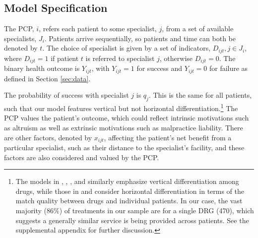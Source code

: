 \documentclass[12pt]{article}
\begin{document}
\subsection{Model Specification}
\label{sec:specification}

The PCP, $i$, refers each patient to some specialist, $j$, from a set of available specialists, $J_i$.  Patients arrive sequentially, so patients and time can both be denoted by $t$. The choice of specialist is given by a set of indicators, $D_{ijt}, j \in J_i$, where $D_{ijt} = 1$ if patient $t$ is referred to specialist $j$, otherwise $D_{ijt} = 0$. The binary health outcome is $Y_{ijt}$, with $Y_{ijt}=1$ for success and  $Y_{ijt}=0$ for failure as defined in Section \ref{sec:data}.

The probability of success with specialist $j$ is $q_j$. This is the same for all patients, such that our model features vertical but not horizontal differentiation.\footnote{The models in \cite{coscelli2004}, \cite{ching2010}, \cite{ferreyra2011}, and \cite{chan2013} similarly emphasize vertical differentiation among drugs, while those in \cite{crawford2005} and \cite{dickstein2018} consider horizontal differentiation in terms of the match quality between drugs and individual patients. In our case, the vast majority (86\%) of treatments in our sample are for a single DRG (470), which suggests a generally similar service is being provided across patients. See the supplemental appendix for further discussion.} The PCP values the patient's outcome, which could reflect intrinsic motivations such as altruism as well as extrinsic motivations such as malpractice liability. There are other factors, denoted by $x_{ijt}$, affecting the patient's net benefit from a particular specialist, such as their distance to the specialist's facility, and these factors are also considered and valued by the PCP.
\end{document}
